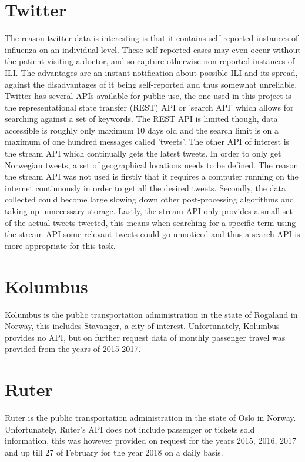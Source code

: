 \section{Twitter}
The reason twitter data is interesting is that it contains self-reported instances of influenza on an individual level. These self-reported cases may even occur without the patient visiting a doctor, and so capture otherwise non-reported instances of ILI. The advantages are an instant notification about possible ILI and its spread, against the disadvantages of it being self-reported and thus somewhat unreliable. Twitter has several APIs available for public use, the one used in this project is the representational state transfer (REST) API or 'search API' which allows for searching against a set of keywords. The REST API is limited though, data accessible is roughly only maximum 10 days old and the search limit is on a maximum of one hundred messages called 'tweets'. The other API of interest is the stream API which continually gets the latest tweets. In order to only get Norwegian tweets, a set of geographical locations needs to be defined. The reason the stream API was not used is firstly that it requires a computer running on the internet continuously in order to get all the desired tweets. Secondly, the data collected could become large slowing down other post-processing algorithms and taking up unnecessary storage. Lastly, the stream API only provides a small set of the actual tweets tweeted, this means when searching for a specific term using the stream API some relevant tweets could go unnoticed and thus a search API is more appropriate for this task.

\section{Kolumbus}
Kolumbus is the public transportation administration in the state of Rogaland in Norway, this includes Stavanger, a city of interest. Unfortunately, Kolumbus provides no API, but on further request data of monthly passenger travel was provided from the years of 2015-2017.

\section{Ruter}
Ruter is the public transportation administration in the state of Oslo in Norway. Unfortunately, Ruter's API does not include passenger or tickets sold information, this was however provided on request for the years 2015, 2016, 2017 and up till 27 of February for the year 2018 on a daily basis.